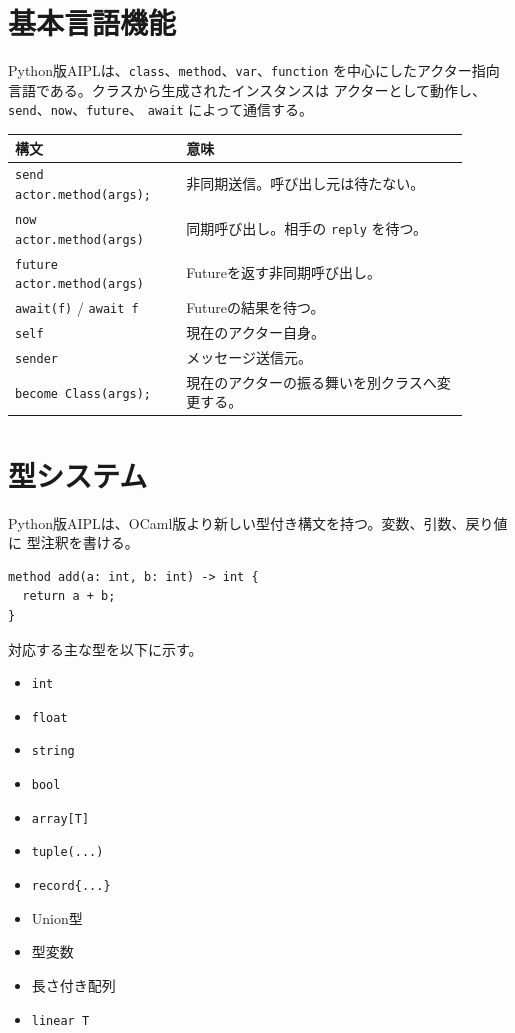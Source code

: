 \documentclass[11pt,a4paper,uplatex,dvipdfmx]{jsarticle}
\begin{document}
\section{基本言語機能}

Python版AIPLは、\texttt{class}、\texttt{method}、\texttt{var}、\texttt{function}
を中心にしたアクター指向言語である。クラスから生成されたインスタンスは
アクターとして動作し、\texttt{send}、\texttt{now}、\texttt{future}、
\texttt{await} によって通信する。

\begin{longtable}{p{0.34\linewidth}p{0.56\linewidth}}
\toprule
構文 & 意味 \\
\midrule
\texttt{send actor.method(args);} & 非同期送信。呼び出し元は待たない。 \\
\texttt{now actor.method(args)} & 同期呼び出し。相手の \texttt{reply} を待つ。 \\
\texttt{future actor.method(args)} & Futureを返す非同期呼び出し。 \\
\texttt{await(f)} / \texttt{await f} & Futureの結果を待つ。 \\
\texttt{self} & 現在のアクター自身。 \\
\texttt{sender} & メッセージ送信元。 \\
\texttt{become Class(args);} & 現在のアクターの振る舞いを別クラスへ変更する。 \\
\bottomrule
\end{longtable}

\section{型システム}

Python版AIPLは、OCaml版より新しい型付き構文を持つ。変数、引数、戻り値に
型注釈を書ける。

\begin{lstlisting}[style=aipl]
method add(a: int, b: int) -> int {
  return a + b;
}
\end{lstlisting}

対応する主な型を以下に示す。

\begin{itemize}
  \item \texttt{int}
  \item \texttt{float}
  \item \texttt{string}
  \item \texttt{bool}
  \item \texttt{array[T]}
  \item \texttt{tuple(...)}
  \item \texttt{record\{...\}}
  \item Union型
  \item 型変数
  \item 長さ付き配列
  \item \texttt{linear T}
\end{itemize}
\end{document}
